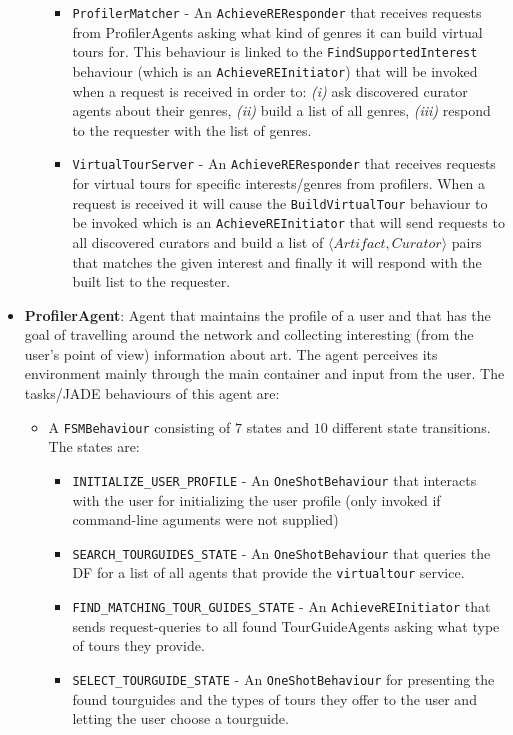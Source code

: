\documentclass[a4paper, 11pt]{article}
\begin{document}
\begin{itemize}
\begin{itemize}
\begin{itemize}
\item \texttt{ProfilerMatcher} - An \texttt{AchieveREResponder} that receives requests from ProfilerAgents asking what kind of genres it can build virtual tours for. This behaviour is linked to the \texttt{FindSupportedInterest} behaviour (which is an \texttt{AchieveREInitiator}) that will be invoked when a request is received in order to: \textit{(i)} ask discovered curator agents about their genres, \textit{(ii)} build a list of all genres, \textit{(iii)} respond to the requester with the list of genres.
\item \texttt{VirtualTourServer} - An \texttt{AchieveREResponder} that receives requests for virtual tours for specific interests/genres from profilers. When a request is received it will cause the \texttt{BuildVirtualTour} behaviour to be invoked which is an \texttt{AchieveREInitiator} that will send requests to all discovered curators and build a list of $\langle Artifact, Curator\rangle$ pairs that matches the given interest and finally it will respond with the built list to the requester.
\end{itemize}
\end{itemize}
\item \textbf{ProfilerAgent}: Agent that maintains the profile of a user and that has the goal of travelling around the network and collecting interesting (from the user's point of view) information about art. The agent perceives its environment mainly through the main container and input from the user. The tasks/JADE behaviours of this agent are:
\begin{itemize}
\item A \texttt{FSMBehaviour} consisting of $7$ states and $10$ different state transitions. The states are:
\begin{itemize}
\item \texttt{INITIALIZE\_USER\_PROFILE} - An \texttt{OneShotBehaviour} that interacts with the user for initializing the user profile (only invoked if command-line aguments were not supplied)
\item \texttt{SEARCH\_TOURGUIDES\_STATE} - An \texttt{OneShotBehaviour} that queries the DF for a list of all agents that provide the \texttt{virtualtour} service.
\item \texttt{FIND\_MATCHING\_TOUR\_GUIDES\_STATE} - An \texttt{AchieveREInitiator} that sends request-queries to all found TourGuideAgents asking what type of tours they provide.
\item \texttt{SELECT\_TOURGUIDE\_STATE} - An \texttt{OneShotBehaviour} for presenting the found tourguides and the types of tours they offer to the user and letting the user choose a tourguide.

\end{itemize}
\end{itemize}
\end{itemize}
\end{document}
